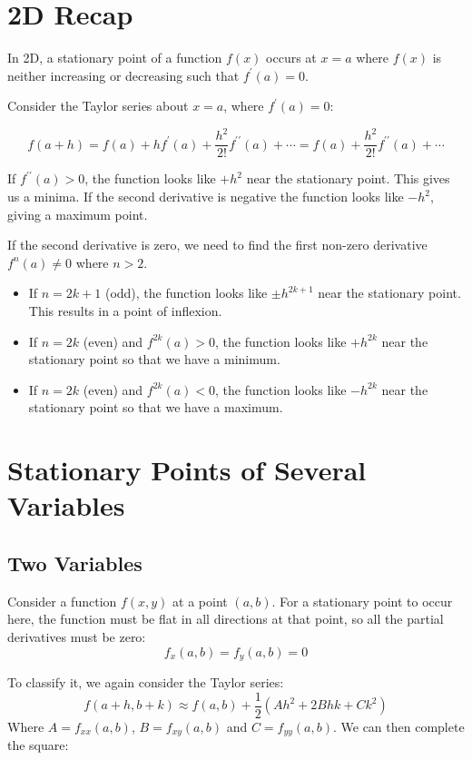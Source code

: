 
\section{2D Recap}
In 2D, a stationary point of a function $f(x)$ occurs at $x = a$ where $f(x)$ is neither increasing or decreasing such that $f^\prime(a) = 0$.

Consider the Taylor series about $x = a$, where $f^\prime(a) = 0$:

\[
    f(a+h) = f(a) + h f^\prime(a) + \frac{h^2}{2!} f^{\prime\prime} (a) + \cdots = f(a) + \frac{h^2}{2!} f^{\prime\prime} (a) + \cdots
\]

If $f^{\prime\prime} (a) > 0$, the function looks like $+h^2$ near the stationary point. This gives us a minima. If the second derivative is negative the function looks like $-h^2$, giving a maximum point.

If the second derivative is zero, we need to find the first non-zero derivative $f^n{(a)} \neq 0$ where $n > 2$.
\begin{itemize}
    \item If $n = 2k + 1$ (odd), the function looks like $\pm h^{2k + 1}$ near the stationary point. This results in a point of inflexion.
    \item If $n = 2k$ (even) and $f^{2k}(a) > 0$, the function looks like $+ h^{2k}$ near the stationary point so that we have a minimum.
    \item If $n = 2k$ (even) and $f^{2k}(a) < 0$, the function looks like $- h^{2k}$ near the stationary point so that we have a maximum.
\end{itemize}

\section{Stationary Points of Several Variables}
\subsection{Two Variables}
Consider a function $f(x, y)$ at a point $(a, b)$. For a stationary point to occur here, the function must be flat in all directions at that point, so all the partial derivatives must be zero:
\[
    f_x(a, b) = f_y(a, b) = 0
\]

To classify it, we again consider the Taylor series:
\[
    f(a+h, b+k) \approx f(a, b) + \frac{1}{2} \left(Ah^2 + 2Bhk + Ck^2\right)
\]
Where $A = f_{xx}(a, b)$, $B = f_{xy}(a,b)$ and $C = f_{yy}(a,b)$. We can then complete the square:


